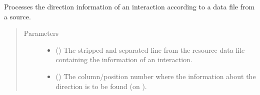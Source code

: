 \documentclass[letterpaper,10pt,english]{sphinxmanual}
\begin{document}
\begin{fulllineitems}

\begin{fulllineitems}
\label{\detokenize{main:pypath.main.PyPath.phosphorylation_signs}}
\end{fulllineitems}


\begin{fulllineitems}
\label{\detokenize{main:pypath.main.PyPath.phosphosite_directions}}
\end{fulllineitems}


\begin{fulllineitems}
\label{\detokenize{main:pypath.main.PyPath.prdb_tissue_expr}}
\end{fulllineitems}


\begin{fulllineitems}
\label{\detokenize{main:pypath.main.PyPath.process_direction}}
Processes the direction information of an interaction according
to a data file from a source.
\begin{quote}\begin{description}
\item[{Parameters}] \leavevmode\begin{itemize}
\item {} 
 () \textendash{} The stripped and separated line from the resource data file
containing the information of an interaction.

\item {} 
 () \textendash{} The column/position number where the information about the
direction is to be found (on ).


\end{itemize}
\end{description}
\end{quote}
\end{fulllineitems}
\end{fulllineitems}
\end{document}
